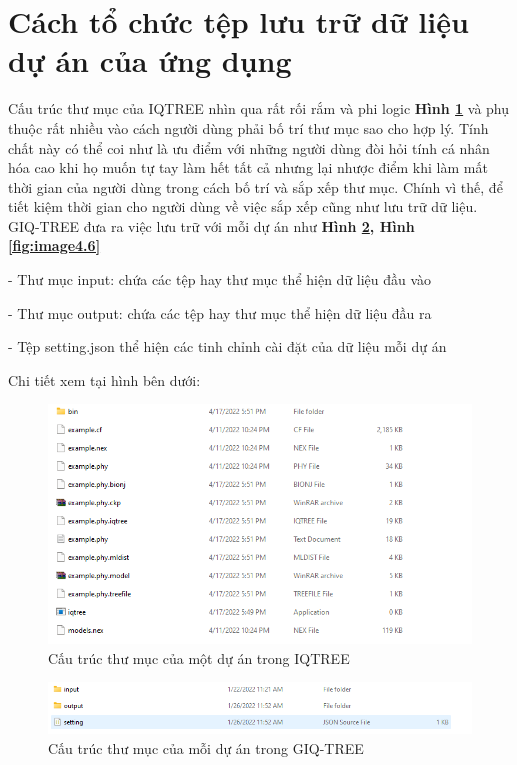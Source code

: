 \documentclass[12pt]{report}
\begin{document}
\section{Cách tổ chức tệp lưu trữ dữ liệu dự án của ứng dụng }
Cấu trúc thư mục của IQTREE nhìn qua rất rối rắm và phi logic \textbf{Hình \ref{fig:image4.4}} và phụ thuộc rất nhiều vào cách người dùng phải bố trí thư mục sao cho hợp lý. Tính chất này có thể coi như là ưu điểm với những người dùng đòi hỏi tính cá nhân hóa cao khi họ muốn tự tay làm hết tất cả nhưng lại nhược điểm khi làm mất thời gian của người dùng trong cách bố trí và sắp xếp thư mục. Chính vì thế, để tiết kiệm thời gian cho người dùng về việc sắp xếp cũng như lưu trữ dữ liệu. GIQ-TREE đưa ra việc lưu trữ với mỗi dự án như \textbf{Hình \ref{fig:image4.5}, Hình \ref{fig:image4.6}} 

- Thư mục input: chứa các tệp hay thư mục thể hiện dữ liệu đầu vào

- Thư mục output: chứa các tệp hay thư mục thể hiện dữ liệu đầu ra

- Tệp setting.json thể hiện các tinh chỉnh cài đặt của dữ liệu mỗi dự án

Chi tiết xem tại hình bên dưới:

\begin{figure}[h]
	\centering
	\includegraphics[scale=1]{Image/4.4.png}
	\caption{Cấu trúc thư mục của một dự án trong IQTREE }
	\label{fig:image4.4}
\end{figure}

\begin{figure}[h]
	\centering
	\includegraphics[scale=1]{Image/4.5.png}
	\caption{Cấu trúc thư mục của mỗi dự án trong GIQ-TREE }
	\label{fig:image4.5}
\end{figure}
\end{document}
